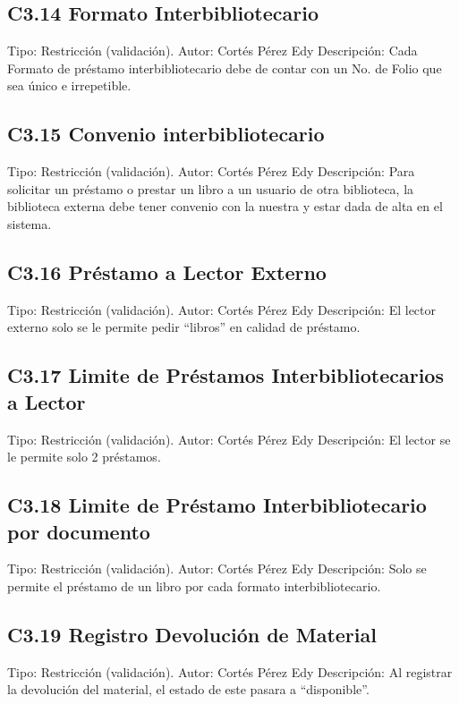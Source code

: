 \subsection{C3.14 Formato Interbibliotecario }
	\UCli Tipo: Restricción (validación).
	\UCli Autor: Cortés Pérez Edy
	\UCli Descripción: Cada Formato de préstamo interbibliotecario debe de contar con un No. de Folio que sea único e irrepetible.
	
\subsection{C3.15 Convenio interbibliotecario }
	\UCli Tipo: Restricción (validación).
	\UCli Autor: Cortés Pérez Edy
	\UCli Descripción: Para solicitar un préstamo o prestar un libro a un usuario de otra biblioteca, la biblioteca externa debe tener convenio con la nuestra y estar dada de alta en el sistema. 

\subsection{C3.16 Préstamo a Lector Externo }
	\UCli Tipo: Restricción (validación).
	\UCli Autor: Cortés Pérez Edy
	\UCli Descripción: El lector externo solo se le permite pedir “libros” en calidad de préstamo. 
	
\subsection{C3.17 Limite de Préstamos Interbibliotecarios a Lector }
	\UCli Tipo: Restricción (validación).
	\UCli Autor: Cortés Pérez Edy
	\UCli Descripción: El lector se le permite solo 2 préstamos.
	
\subsection{C3.18 Limite de Préstamo Interbibliotecario por documento }
	\UCli Tipo: Restricción (validación).
	\UCli Autor: Cortés Pérez Edy
	\UCli Descripción: Solo se permite el préstamo de un libro por cada formato interbibliotecario.
	
\subsection{C3.19 Registro Devolución de Material }
	\UCli Tipo: Restricción (validación).
	\UCli Autor: Cortés Pérez Edy
	\UCli Descripción: Al registrar la devolución del material, el estado de este pasara a “disponible”.
	
